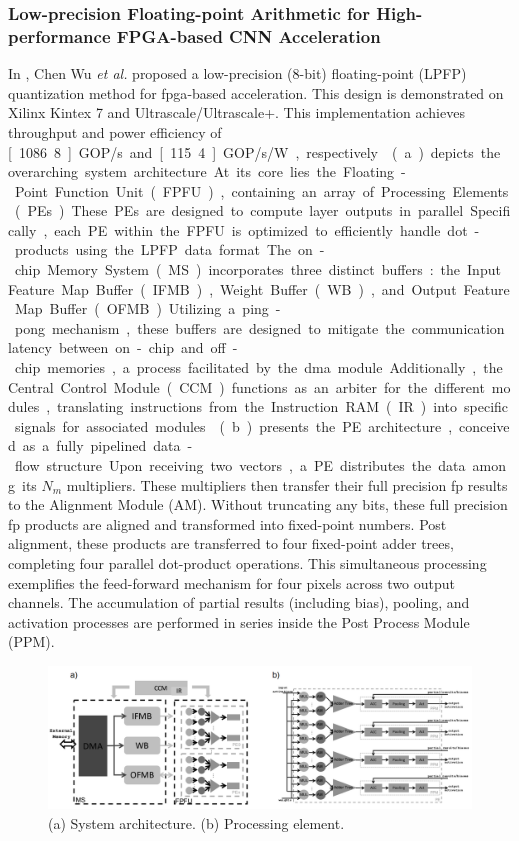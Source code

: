 \subsubsection{Low-precision Floating-point Arithmetic for High-performance FPGA-based CNN Acceleration}
In \cite{wu2021low}, Chen Wu \textit{et al.} proposed a low-precision (8-bit) floating-point (LPFP) quantization method for \gls{fpga}-based acceleration. This design is demonstrated on Xilinx Kintex 7 and Ultrascale/Ultrascale+. This implementation achieves throughput and power efficiency of \unit[1086.8]{GOP/s} and \unit[115.4]{GOP/s/W}, respectively.

(a) depicts the overarching system architecture. At its core lies the Floating-Point Function Unit (FPFU), containing an array of Processing Elements (PEs). These PEs are designed to compute layer outputs in parallel. Specifically, each PE within the FPFU is optimized to efficiently handle dot-products using the LPFP data format. The on-chip Memory System (MS) incorporates three distinct buffers: the Input Feature Map Buffer (IFMB), Weight Buffer (WB), and Output Feature Map Buffer (OFMB). Utilizing a ping-pong mechanism, these buffers are designed to mitigate the communication latency between on-chip and off-chip memories, a process facilitated by the \gls{dma} module. Additionally, the Central Control Module (CCM) functions as an arbiter for the different modules, translating instructions from the Instruction RAM (IR) into specific signals for associated modules.

(b) presents the PE architecture, conceived as a fully pipelined data-flow structure. Upon receiving two vectors, a PE distributes the data among its $N_m$ multipliers. These multipliers then transfer their full precision \gls{fp} results to the Alignment Module (AM). Without truncating any bits, these full precision \gls{fp} products are aligned and transformed into fixed-point numbers. Post alignment, these products are transferred to four fixed-point adder trees, completing four parallel dot-product operations. This simultaneous processing exemplifies the feed-forward mechanism for four pixels across two output channels. The accumulation of partial results (including bias), pooling, and activation processes are performed in series inside the Post Process Module (PPM).

\begin{figure}[h!]
	\centering
	\includegraphics[width=\textwidth]{./figures/2_g.png}
	\caption{(a) System architecture. (b) Processing element.}
	\label{fig:wu2021low}
\end{figure}


